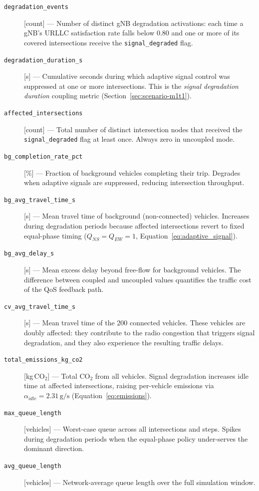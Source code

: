 \begin{description}

\item[\texttt{degradation\_events}] [count] ---
  Number of distinct gNB degradation activations: each time a gNB's URLLC
  satisfaction rate falls below 0.80 and one or more of its covered
  intersections receive the \texttt{signal\_degraded} flag.

\item[\texttt{degradation\_duration\_s}] [s] ---
  Cumulative seconds during which adaptive signal control was suppressed at one
  or more intersections.  This is the \emph{signal degradation duration}
  coupling metric (Section~\ref{sec:scenario-m1t1}).

\item[\texttt{affected\_intersections}] [count] ---
  Total number of distinct intersection nodes that received the
  \texttt{signal\_degraded} flag at least once.  Always zero in uncoupled mode.

\item[\texttt{bg\_completion\_rate\_pct}] [\%] ---
  Fraction of background vehicles completing their trip.  Degrades when
  adaptive signals are suppressed, reducing intersection throughput.

\item[\texttt{bg\_avg\_travel\_time\_s}] [s] ---
  Mean travel time of background (non-connected) vehicles.  Increases during
  degradation periods because affected intersections revert to fixed
  equal-phase timing ($Q_{NS} = Q_{EW} = 1$,
  Equation~\ref{eq:adaptive_signal}).

\item[\texttt{bg\_avg\_delay\_s}] [s] ---
  Mean excess delay beyond free-flow for background vehicles.  The difference
  between coupled and uncoupled values quantifies the traffic cost of the QoS
  feedback path.

\item[\texttt{cv\_avg\_travel\_time\_s}] [s] ---
  Mean travel time of the 200 connected vehicles.  These vehicles are doubly
  affected: they contribute to the radio congestion that triggers signal
  degradation, and they also experience the resulting traffic delays.

\item[\texttt{total\_emissions\_kg\_co2}] [kg\,CO$_2$] ---
  Total CO$_2$ from all vehicles.  Signal degradation increases idle time at
  affected intersections, raising per-vehicle emissions via
  $\alpha_{idle} = 2.31\,\text{g/s}$ (Equation~\ref{eq:emissions}).

\item[\texttt{max\_queue\_length}] [vehicles] ---
  Worst-case queue across all intersections and steps.  Spikes during
  degradation periods when the equal-phase policy under-serves the dominant
  direction.

\item[\texttt{avg\_queue\_length}] [vehicles] ---
  Network-average queue length over the full simulation window.

\end{description}
